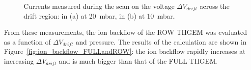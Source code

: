 \documentclass[a4paper, 11 pt]{article}
\newcommand{\Vdrift}{$ \Delta V_{drift}$}
\begin{document}
\begin{figure}[!htb]
	\centering
	\caption{Currents measured during the scan on the voltage \Vdrift{} across the drift region: in (a) at 20~mbar, in (b) at 10~mbar.}
	\label{fig:drift_ROWTHGEM_20and10_mbar}
\end{figure}



From these measurements, the ion backflow of the ROW THGEM was evaluated as a function of \Vdrift{} and pressure.
The results of the calculation are shown in Figure~\ref{fig:ion_backflow_FULLandROW}: the ion backflow rapidly increases at increasing \Vdrift{} and is much bigger than that of the FULL THGEM.
\end{document}
